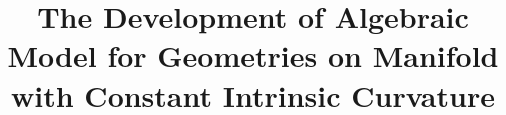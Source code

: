 \documentclass[stu, babel, american, biblatex, a4paper, leqno]{apa7}
\title{The Development of Algebraic Model for Geometries on Manifold with Constant Intrinsic Curvature}
\begin{document}
\maketitle
\tableofcontents




\section*{}
\printbibliography

\appendix

\end{document}
